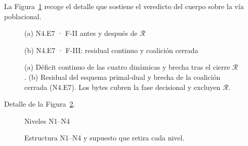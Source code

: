 
La Figura~\ref{fig:continuas-resultados} recoge el detalle que sostiene el
veredicto del cuerpo sobre la vía poblacional.

\begin{figure}[H]\centering
{}
{(a) N4.E7 · F-II antes y después de $\mathcal R$}
\par\vspace{.8mm}
{(b) N4.E7 · F-III: residual continuo y coalición cerrada}
\caption{(a) Déficit continuo de las cuatro dinámicas y brecha tras el cierre
$\mathcal R$. (b) Residual del esquema primal-dual y brecha de la coalición cerrada
(N4.E7). Los bytes cubren la fase decisional y excluyen $\mathcal R$.}
\label{fig:continuas-resultados}
\viuownsource
\end{figure}






Detalle de la Figura~\ref{fig:niveles}.

\begin{figure}[H]\centering
{}
{Niveles N1--N4}
\caption{Estructura N1--N4 y supuesto que retira cada nivel.}
\label{fig:niveles}
\viuownsource
\end{figure}




